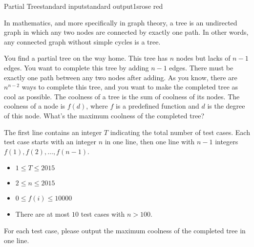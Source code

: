 \begin{problem}{Partial Tree}{standard input}{standard output}{1s}{rose red}

In mathematics, and more specifically in graph theory, a tree is an undirected graph in which any two nodes are connected by exactly one path. In other words, any connected graph without simple cycles is a tree.

You find a partial tree on the way home. This tree has $n$ nodes but lacks of $n-1$ edges.
You want to complete this tree by adding $n-1$ edges.
There must be exactly one path between any two nodes after adding.
As you know, there are $n^{n-2}$ ways to complete this tree,
and you want to make the completed tree as cool as possible.
The coolness of a tree is the sum of coolness of its nodes.
The coolness of a node is $f(d)$, where $f$ is a predefined function and $d$ is the degree of this node.
What's the maximum coolness of the completed tree?

\InputFile
The first line contains an integer $T$ indicating the total number of test cases.
Each test case starts with an integer $n$ in one line,
then one line with $n - 1$ integers $f(1), f(2), \ldots, f(n-1)$.
\begin{itemize}
\item $1 \le T \le 2015$
\item $2 \le n \le 2015$
\item $0 \le f(i) \le 10000$
\item There are at most $10$ test cases with $n > 100$.
\end{itemize}

\OutputFile
For each test case, please output the maximum coolness of the completed tree in one line.

\Example

\begin{example}
%
\end{example}
\end{problem}